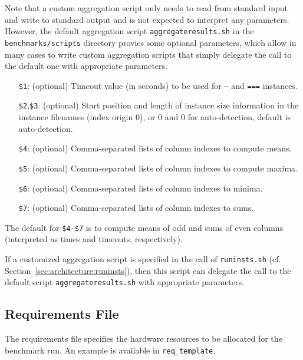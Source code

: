 \documentclass[a4paper]{article}
\begin{document}
			Note that a custom aggregation script only needs to read from standard input and write to standard output
			and is not expected to interpret any parameters.
			However,
			the default aggregation script {\tt aggregateresults.sh} in the {\tt benchmarks/scripts} directory
			provies some optional parameters, which allow in many cases to write custom aggregation scripts
			that simply delegate the call to the default one with appropriate parameters.
	
		    \medskip{}
		    \begin{itemize}
				\item[{\tt \$1}:] (optional) Timeout value (in seconds) to be used for {\tt ---} and {\tt ===} instances.
				\item[{\tt \$2},{\tt \$3}:] (optional) Start position and length of instance size information in the instance filenames (index origin $0$),
					or $0$ and $0$ for auto-detection, default is auto-detection.
				\item[{\tt \$4}:] (optional) Comma-separated lists of column indexes to compute means.
				\item[{\tt \$5}:] (optional) Comma-separated lists of column indexes to compute maxima.
				\item[{\tt \$6}:] (optional) Comma-separated lists of column indexes to minima.
				\item[{\tt \$7}:] (optional) Comma-separated lists of column indexes to sums.
		    \end{itemize}
	
			The default for {\tt \$4-\$7}
			is to compute means of odd and sums of even columns (interpreted as times and timeouts, respectively).
	
			If a customized aggregation script is specified in the call of {\tt runinsts.sh} (cf. Section~\ref{sec:architecture:runinsts}),
			then this script can delegate the call to the default script {\tt aggregateresults.sh} with appropriate parameters.
	
		\subsection{Requirements File}
		\label{sec:architecture:reqfile}
				
			The requirements file specifies the hardware resources to be allocated
			for the benchmark run.
			An example is available in {\tt req\_template}.
			
\end{document}
